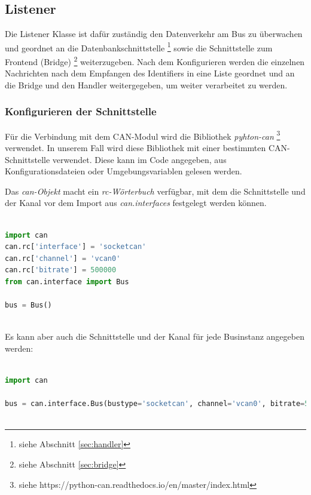 \newpage

\subsection{Listener} \label{sec:listener}

Die Listener Klasse ist dafür zuständig den Datenverkehr am Bus zu überwachen und geordnet an die Datenbankschnittstelle \footnote{siehe Abschnitt \ref{sec:handler}} sowie die Schnittstelle zum Frontend (Bridge) \footnote{siehe Abschnitt \ref{sec:bridge}} weiterzugeben. Nach dem Konfigurieren werden die einzelnen Nachrichten nach dem Empfangen des Identifiers in eine Liste geordnet und an die Bridge und den Handler weitergegeben, um weiter verarbeitet zu werden. 

\subsubsection{Konfigurieren der Schnittstelle}

Für die Verbindung mit dem CAN-Modul wird die Bibliothek \textit{pyhton-can} \footnote{siehe https://python-can.readthedocs.io/en/master/index.html} verwendet. In unserem Fall wird diese Bibliothek mit einer bestimmten CAN-Schnittstelle verwendet. Diese kann im Code angegeben, aus Konfigurationsdateien oder Umgebungsvariablen gelesen werden.	

Das \textit{can-Objekt} macht ein \textit{rc-Wörterbuch} verfügbar, mit dem die Schnittstelle und der Kanal vor dem Import aus \textit{can.interfaces} festgelegt werden können. 

\begin{lstlisting}[language=Python, caption={Konfigurieren des CAN Adapters vor Import},captionpos=b]
	
import can
can.rc['interface'] = 'socketcan'
can.rc['channel'] = 'vcan0'
can.rc['bitrate'] = 500000
from can.interface import Bus
	
bus = Bus()
	
\end{lstlisting}

Es kann aber auch die Schnittstelle und der Kanal für jede Businstanz angegeben werden:

\begin{lstlisting}[language=Python, caption={Konfigurieren des CAN Adapters in Code},captionpos=b]
	
import can
	
bus = can.interface.Bus(bustype='socketcan', channel='vcan0', bitrate=500000)
	
\end{lstlisting}

